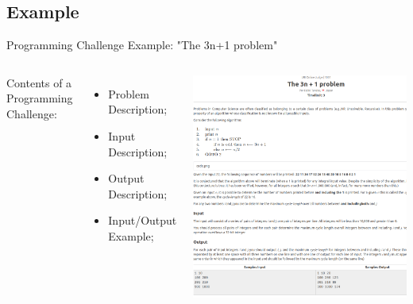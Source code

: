 \subsection{Example}
\begin{frame}{Programming Challenge Example: "The 3n+1 problem"}
  \begin{columns}
      Contents of a Programming Challenge:
      \begin{itemize}
        \item Problem Description;
        \item Input Description;
        \item Output Description;
        \item Input/Output Example;
      \end{itemize}

    \includegraphics[width=1\textwidth]{img/3n_problem_label}
  \end{columns}
\end{frame}

